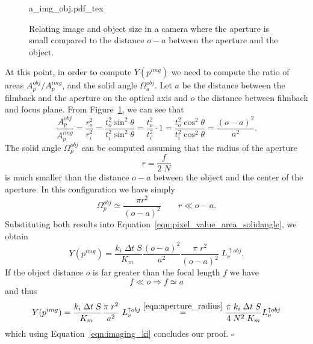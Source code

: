 \begin{figure}[t]
    \centering
    \def\svgwidth{0.9\linewidth}
    {a_img_obj.pdf_tex} 
    \caption{\label{fig:aperture_distance}%
        Relating image and object size in a camera where the aperture is small compared to the distance
        $o-a$ between the aperture and the object.}
\end{figure}

At this point, in order to compute $Y(p^{img})$ we need to compute the ratio of
areas $A_p^{obj}/A_p^{img}$, and the solid angle $\Omega_a^{obj}$. Let $a$ be the distance between the filmback and the
aperture on the optical axis and $o$ the distance between filmback and focus
plane. From Figure~\ref{fig:aperture_distance}, we can see that
\begin{equation*}
    \frac{A_p^{obj}}{A^{img}_p}
    = \frac{r_o^2}{r_i^2}
    = \frac{t_o^2 \sin^2\theta}{t_i^2 \sin^2\theta}
    = \frac{t_o^2}{t_i^2} \cdot 1
    = \frac{t_o^2 \cos^2\theta}{t_i^2 \cos^2\theta}
    = \frac{(o-a)^2}{a^2}.
\end{equation*}
The solid angle $\Omega_p^{obj}$ can be computed assuming that the radius of the
aperture 
\begin{equation}\label{eqn:aperture_radius}
    r = \frac{f}{2\;N}
\end{equation}
is much smaller than the distance $o-a$ between the object
and the center of the aperture. In this configuration we have simply
\begin{equation}\label{eqn:imaging_omegapobj}
\Omega_p^{obj} \simeq \frac{\pi r^2}{(o-a)^2} \qquad r \ll o-a.
\end{equation}
Substituting both results into Equation~\eqref{eqn:pixel_value_area_solidangle}, we obtain
\begin{equation}\label{eqn:imaging_y2}
Y(p^{img}) =  \frac{k_i\; \Delta t \; S}{K_m\;} \frac{(o-a)^2}{a^2} \frac{\pi\;r^2}{(o-a)^2}\; L_v^{\uparrow obj}.
\end{equation}
If the object distance $o$ is far greater than the focal length $f$ we have
\begin{equation}
f \ll o \Rightarrow  f \simeq a
\end{equation}
and thus
\begin{equation}
  Y(p^{img}) =  \frac{k_i\; \Delta t \; S}{K_m\;} \frac{\pi\;r^2}{a^2}\; L_v^{\uparrow obj} \stackrel{\eqref{eqn:aperture_radius}}{=}
   \frac{\pi\; k_i\; \Delta t \; S}{4\;N^2\;K_m} L_v^{\uparrow obj} 
\end{equation}
which using Equation~\eqref{eqn:imaging_ki} concludes our proof. \hfill $\square$

